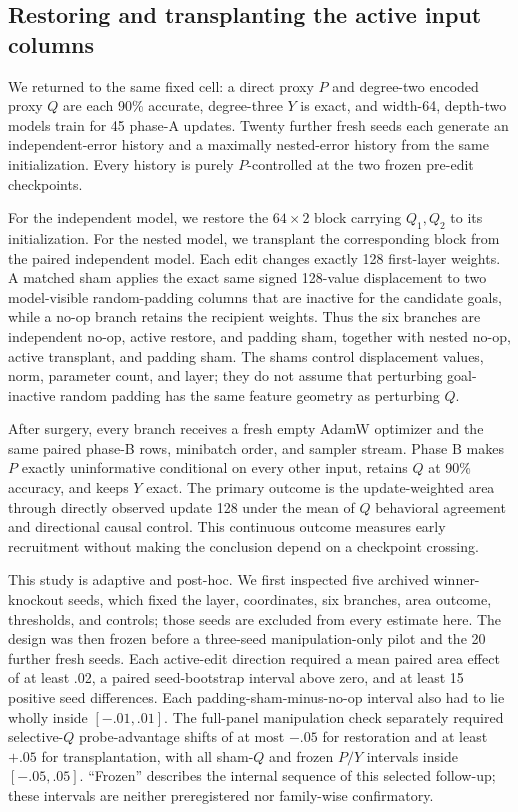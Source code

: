 \documentclass[11pt,a4paper]{article}
\begin{document}
\subsection*{Restoring and transplanting the active input columns}

We returned to the same fixed cell: a direct proxy $P$ and degree-two encoded proxy $Q$ are each 90\% accurate, degree-three $Y$ is exact, and width-64, depth-two models train for 45 phase-A updates. Twenty further fresh seeds each generate an independent-error history and a maximally nested-error history from the same initialization. Every history is purely $P$-controlled at the two frozen pre-edit checkpoints.

For the independent model, we restore the $64\times2$ block carrying $Q_1,Q_2$ to its initialization. For the nested model, we transplant the corresponding block from the paired independent model. Each edit changes exactly 128 first-layer weights. A matched sham applies the exact same signed 128-value displacement to two model-visible random-padding columns that are inactive for the candidate goals, while a no-op branch retains the recipient weights. Thus the six branches are independent no-op, active restore, and padding sham, together with nested no-op, active transplant, and padding sham. The shams control displacement values, norm, parameter count, and layer; they do not assume that perturbing goal-inactive random padding has the same feature geometry as perturbing $Q$.

After surgery, every branch receives a fresh empty AdamW optimizer and the same paired phase-B rows, minibatch order, and sampler stream. Phase B makes $P$ exactly uninformative conditional on every other input, retains $Q$ at 90\% accuracy, and keeps $Y$ exact. The primary outcome is the update-weighted area through directly observed update 128 under the mean of $Q$ behavioral agreement and directional causal control. This continuous outcome measures early recruitment without making the conclusion depend on a checkpoint crossing.

This study is adaptive and post-hoc. We first inspected five archived winner-knockout seeds, which fixed the layer, coordinates, six branches, area outcome, thresholds, and controls; those seeds are excluded from every estimate here. The design was then frozen before a three-seed manipulation-only pilot and the 20 further fresh seeds. Each active-edit direction required a mean paired area effect of at least .02, a paired seed-bootstrap interval above zero, and at least 15 positive seed differences. Each padding-sham-minus-no-op interval also had to lie wholly inside $[-.01,.01]$. The full-panel manipulation check separately required selective-$Q$ probe-advantage shifts of at most $-.05$ for restoration and at least $+.05$ for transplantation, with all sham-$Q$ and frozen $P/Y$ intervals inside $[-.05,.05]$. ``Frozen'' describes the internal sequence of this selected follow-up; these intervals are neither preregistered nor family-wise confirmatory.
\end{document}
